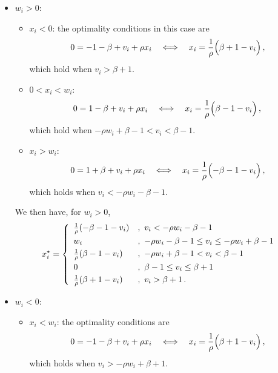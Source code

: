 \documentclass[letter,10pt]{article}
\theoremstyle{definition}
\theoremstyle{nonumberplain}
\begin{document}
	\begin{itemize}
		\item $w_i > 0$:

		\begin{itemize}
			\item $x_i < 0$: the optimality conditions in this case are
			\begin{align*}
				0 = -1 - \beta + v_i + \rho x_i
				\quad \Longleftrightarrow\quad
				x_i = \frac{1}{\rho}\Bigl(\beta + 1 - v_i\Bigr)\,,
			\end{align*}
			which hold when $v_i > \beta + 1$.

			\item $0 <x_i < w_i$:
			\begin{align*}
				0 = 1 - \beta + v_i + \rho x_i
				\quad\Longleftrightarrow\quad
				x_i = \frac{1}{\rho}\Bigl(\beta - 1 - v_i\Bigr)\,,
			\end{align*}
			which hold when $-\rho w_i  + \beta -1 < v_i < \beta - 1$.

			\item $x_i > w_i$:
			\begin{align*}
				0 = 1 + \beta + v_i + \rho x_i
				\quad \Longleftrightarrow\quad
				x_i = \frac{1}{\rho}\Bigl(-\beta - 1 - v_i\Bigr)\,,
			\end{align*}
			which holds when $v_i < -\rho w_i - \beta - 1$.

		\end{itemize}
		We then have, for $w_i >0$,
			$$
				x_i^\star
				=
				\left\{
					\begin{array}{ll}
						\frac{1}{\rho}(-\beta - 1 - v_i) &,\,\, v_i < -\rho w_i - \beta - 1 \vspace{0.1cm}\\
						w_i &,\,\, -\rho w_i - \beta - 1 \leq v_i \leq -\rho w_i + \beta - 1 \vspace{0.1cm}\\
						\frac{1}{\rho}(\beta - 1 - v_i) &,\,\, -\rho w_i  + \beta -1 < v_i < \beta - 1 \vspace{0.1cm}\\
						0  &,\,\, \beta - 1 \leq v_i \leq \beta + 1 \vspace{0.1cm}\\
						\frac{1}{\rho}(\beta + 1 - v_i) &,\,\, v_i > \beta + 1\,.
					\end{array}
				\right.
			$$

	\item $w_i < 0$:

		\begin{itemize}
			\item $x_i < w_i$: the optimality conditions are
				$$
					0 = -1 - \beta + v_i + \rho x_i
					\quad\Longleftrightarrow\quad
					x_i = \frac{1}{\rho}\Bigl(\beta + 1 - v_i\Bigr)\,,
				$$
				which holds when $v_i > -\rho w_i + \beta + 1$.


\end{itemize}
\end{itemize}
\end{document}

